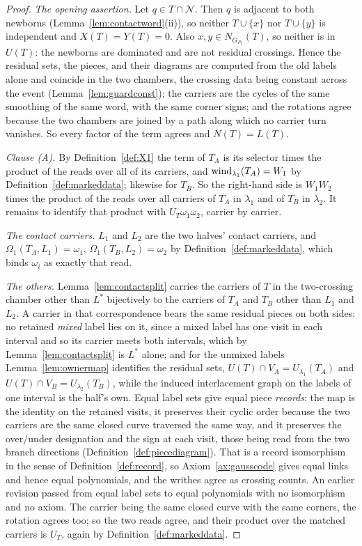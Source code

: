 \begin{proof}
\emph{The opening assertion.} Let $q\in T\cap\mathcal N$. Then $q$ is adjacent to both newborns
(Lemma~\ref{lem:contactword}(ii)), so neither $T\cup\{x\}$ nor $T\cup\{y\}$ is
independent and $X(T)=Y(T)=0$. Also $x,y\in N_{G_{P_2}}(T)$, so neither is in
$U(T)$: the newborns are dominated and are not residual crossings. Hence the
residual sets, the pieces, and their diagrams are computed from the old labels
alone and coincide in the two chambers, the crossing data being constant across
the event (Lemma~\ref{lem:guardconst}); the carriers are the cycles of the same
smoothing of the same word, with the same corner signs; and the rotations agree
because the two chambers are joined by a path along which no carrier turn
vanishes. So every factor of the term agrees and $N(T)=L(T)$.

\emph{Clause (A).} By Definition~\ref{def:X1} the term of $T_A$ is its selector times the product
of the reads over all of its carriers, and $\operatorname{wind}_{\lambda_1}(T_A)=W_1$ by
Definition~\ref{def:markeddata}; likewise for $T_B$. So the right-hand side is
$W_1W_2$ times the product of the reads over all carriers of $T_A$ in
$\lambda_1$ and of $T_B$ in $\lambda_2$. It remains to identify that product
with $U_T\omega_1\omega_2$, carrier by carrier.

\emph{The contact carriers.} $L_1$ and $L_2$ are the two halves' contact
carriers, and $\Omega_1(T_A,L_1)=\omega_1$, $\Omega_1(T_B,L_2)=\omega_2$ by
Definition~\ref{def:markeddata}, which binds $\omega_i$ as exactly that read.

\emph{The others.} Lemma~\ref{lem:contactsplit} carries the carriers of $T$ in
the two-crossing chamber other than $L^{*}$ bijectively to the carriers of
$T_A$ and $T_B$ other than $L_1$ and $L_2$. A carrier in that correspondence
bears the same residual pieces on both sides: no retained \emph{mixed} label
lies on it, since a mixed label has one visit in each interval and so its
carrier meets both intervals, which by Lemma~\ref{lem:contactsplit} is $L^{*}$
alone; and for the unmixed labels Lemma~\ref{lem:ownermap} identifies the
residual sets, $U(T)\cap V_A=U_{\lambda_1}(T_A)$ and
$U(T)\cap V_B=U_{\lambda_2}(T_B)$, while the induced interlacement graph on the
labels of one interval is the half's own. Equal label sets give equal piece \emph{records}: the map is the identity on the
retained visits, it preserves their cyclic order because the two carriers are
the same closed curve traversed the same way, and it preserves the over/under
designation and the sign at each visit, those being read from the two branch
directions (Definition~\ref{def:piecediagram}). That is a record isomorphism in
the sense of Definition~\ref{def:record}, so Axiom~\ref{ax:gausscode} gives
equal links and hence equal polynomials, and the writhes agree as crossing
counts. An earlier revision passed from equal label sets to equal polynomials
with no isomorphism and no axiom. The carrier being the same closed curve with
the same corners, the rotation agrees too; so the two reads agree, and
their product over the matched carriers is $U_T$, again by
Definition~\ref{def:markeddata}.


\end{proof}
